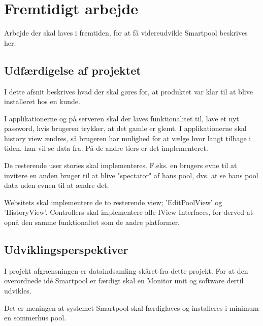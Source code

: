\chapter{Fremtidigt arbejde}
Arbejde der skal laves i fremtiden, for at få videreudvikle Smartpool beskrives her.
\section{Udfærdigelse af projektet}
I dette afsnit beskrives hvad der skal gøres for, at produktet var klar til at blive installeret hos en kunde.

I applikationerne og på serveren skal der laves funktionalitet til, lave et nyt password, hvis brugeren trykker, at det gamle er glemt.
I applikationerne skal history view ændres, så brugeren har mulighed for at vælge hvor langt tilbage i tiden, han vil se data fra. På de andre tiers er det implementeret.

De resterende user stories skal implementeres. F.eks. en brugers evne til at invitere en anden bruger til at blive "spectator" af hans pool, dvs. at se hans pool data uden evnen til at ændre det.

Websitets skal implementere de to resterende view; 'EditPoolView' og 'HistoryView'. Controllers skal implementere alle IView Interfaces, for derved at opnå den samme funktionaltet som de andre platformer.  


\section{Udviklingsperspektiver}
I projekt afgrænsningen er dataindsamling skåret fra dette projekt. For at den overordnede idé Smartpool er færdigt skal en Monitor unit og software dertil udvikles.

Det er meningen at systemet Smartpool skal færdiglaves og installeres i minimum en sommerhus pool.